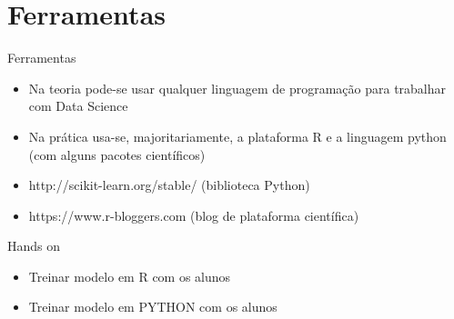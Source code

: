 \section{Ferramentas}

\begin{frame}	
	\begin{block}{Ferramentas}	
		\begin{itemize}
			\item Na teoria pode-se usar qualquer linguagem de programação para trabalhar com Data Science
			\item Na prática usa-se, majoritariamente, a plataforma R e a linguagem python (com alguns pacotes científicos)
			\item http://scikit-learn.org/stable/  (biblioteca Python)
			\item https://www.r-bloggers.com (blog de plataforma científica)
		\end{itemize}		
	\end{block}
\end{frame}

\begin{frame}	
	\begin{block}{Hands on}	
		\begin{itemize}
			\item Treinar modelo em R com os alunos
			\item Treinar modelo em PYTHON com os alunos
		\end{itemize}		
	\end{block}
\end{frame}

